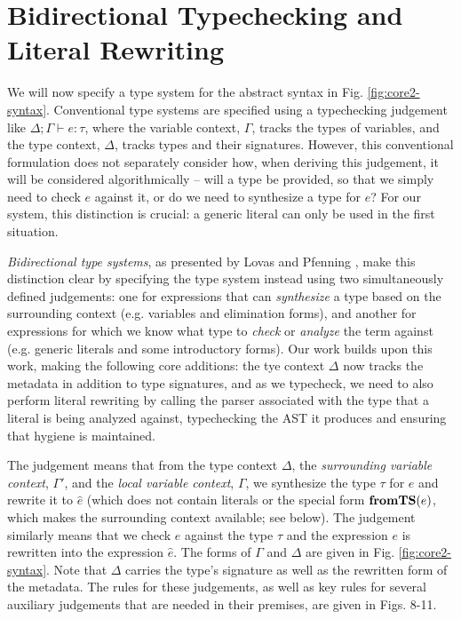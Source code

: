 \section{Bidirectional Typechecking and Literal Rewriting}
We will now specify a type system for the abstract syntax in Fig. \ref{fig:core2-syntax}. Conventional type systems are specified using a typechecking judgement like $\Delta; \Gamma \vdash e : \tau$, where the variable context, $\Gamma$, tracks the types of variables, and the type context, $\Delta$, tracks types and their signatures. However, this conventional formulation does not separately consider how, when deriving this judgement, it will be considered algorithmically -- will a type be provided, so that we simply need to check $e$ against it, or do we need to synthesize a type for $e$? For our system, this distinction is crucial: a generic literal can only be used in the first situation. 

\emph{Bidirectional type systems}, as presented by Lovas and Pfenning \cite{Lovas08abidirectional}, make this distinction clear by specifying the type system instead using two simultaneously defined judgements: one for expressions that can \emph{synthesize} a type based on the surrounding context (e.g. variables and elimination forms), and another for expressions for which we know what type to \emph{check} or \emph{analyze} the term against (e.g. generic literals and some introductory forms). 
Our work builds upon this work, making the following core additions: the tye context $\Delta$ now tracks the metadata in addition to type signatures, and as we typecheck, we need to also perform literal rewriting by calling the parser associated with the type that a literal is being analyzed against, typechecking the AST it produces and ensuring that hygiene is maintained.

The judgement 
means that from the type context $\Delta$, the \emph{surrounding variable context}, $\Gamma'$, and the \emph{local variable context}, $\Gamma$, we synthesize the type $\tau$ for $e$ and rewrite it to  $\hat{e}$ (which does not contain literals or the special form $\textbf{fromTS}(e)$, which makes the surrounding context available; see below).
The judgement 
 similarly 
means that we check $e$ against the type $\tau$ and the expression $e$ is rewritten into the expression $\hat{e}$. The forms of $\Gamma$ and $\Delta$ are given in Fig. \ref{fig:core2-syntax}. Note that $\Delta$ carries the type's signature as well as the rewritten form of the metadata. The rules for these judgements, as well as key rules for several auxiliary judgements that are needed in their premises, are given in Figs. 8-11. 

